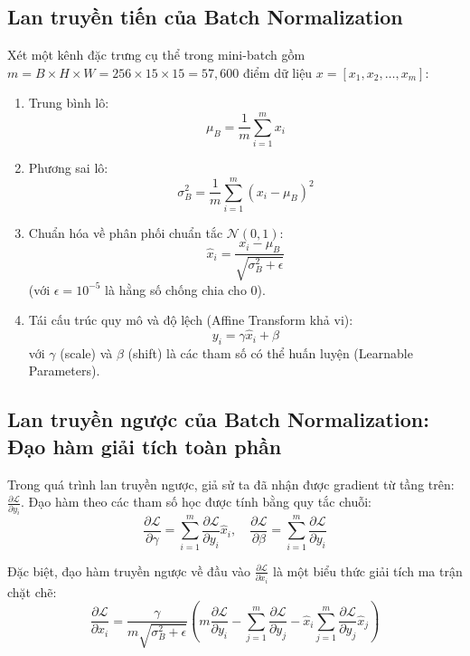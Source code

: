 \documentclass[11pt,a4paper]{report}
\begin{document}
\subsection{Lan truyền tiến của Batch Normalization}
Xét một kênh đặc trưng cụ thể trong mini-batch gồm $m = B \times H \times W = 256 \times 15 \times 15 = 57{,}600$ điểm dữ liệu $x = [x_1, x_2, \dots, x_m]$:
\begin{enumerate}
    \item Trung bình lô:
    \begin{equation}
        \mu_B = \frac{1}{m} \sum_{i=1}^m x_i
    \end{equation}
    \item Phương sai lô:
    \begin{equation}
        \sigma_B^2 = \frac{1}{m} \sum_{i=1}^m (x_i - \mu_B)^2
    \end{equation}
    \item Chuẩn hóa về phân phối chuẩn tắc $\mathcal{N}(0, 1)$:
    \begin{equation}
        \hat{x}_i = \frac{x_i - \mu_B}{\sqrt{\sigma_B^2 + \epsilon}}
    \end{equation}
    (với $\epsilon = 10^{-5}$ là hằng số chống chia cho 0).
    \item Tái cấu trúc quy mô và độ lệch (Affine Transform khả vi):
    \begin{equation}
        y_i = \gamma \hat{x}_i + \beta
    \end{equation}
    với $\gamma$ (scale) và $\beta$ (shift) là các tham số có thể huấn luyện (Learnable Parameters).
\end{enumerate}

\subsection{Lan truyền ngược của Batch Normalization: Đạo hàm giải tích toàn phần}
Trong quá trình lan truyền ngược, giả sử ta đã nhận được gradient từ tầng trên: $\frac{\partial \mathcal{L}}{\partial y_i}$. Đạo hàm theo các tham số học được tính bằng quy tắc chuỗi:
\begin{equation}
    \frac{\partial \mathcal{L}}{\partial \gamma} = \sum_{i=1}^m \frac{\partial \mathcal{L}}{\partial y_i} \hat{x}_i, \quad \frac{\partial \mathcal{L}}{\partial \beta} = \sum_{i=1}^m \frac{\partial \mathcal{L}}{\partial y_i}
\end{equation}

Đặc biệt, đạo hàm truyền ngược về đầu vào $\frac{\partial \mathcal{L}}{\partial x_i}$ là một biểu thức giải tích ma trận chặt chẽ:
\begin{equation}
    \frac{\partial \mathcal{L}}{\partial x_i} = \frac{\gamma}{m \sqrt{\sigma_B^2 + \epsilon}} \left( m \frac{\partial \mathcal{L}}{\partial y_i} - \sum_{j=1}^m \frac{\partial \mathcal{L}}{\partial y_j} - \hat{x}_i \sum_{j=1}^m \frac{\partial \mathcal{L}}{\partial y_j} \hat{x}_j \right)
\end{equation}
\end{document}
